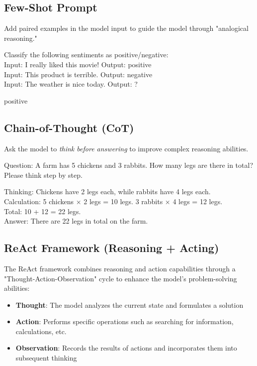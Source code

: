 \documentclass[12pt]{article}
\begin{document}
\subsection{Few-Shot Prompt}
Add paired examples in the model input to guide the model through "analogical reasoning."
\begin{promptbox}
Classify the following sentiments as positive/negative:\\
Input: I really liked this movie! Output: positive\\
Input: This product is terrible. Output: negative\\
Input: The weather is nice today. Output: ?
\end{promptbox}
\begin{outputbox}
positive
\end{outputbox}

\subsection{Chain-of-Thought (CoT)}
Ask the model to \emph{think before answering} to improve complex reasoning abilities.
\begin{promptbox}
Question: A farm has 5 chickens and 3 rabbits. How many legs are there in total? Please think step by step.
\end{promptbox}
\begin{outputbox}
Thinking: Chickens have 2 legs each, while rabbits have 4 legs each.\\
Calculation: 5 chickens × 2 legs = 10 legs. 3 rabbits × 4 legs = 12 legs.\\
Total: 10 + 12 = 22 legs.\\
Answer: There are 22 legs in total on the farm.
\end{outputbox}

\subsection{ReAct Framework (Reasoning + Acting)}
The ReAct framework combines reasoning and action capabilities through a "Thought-Action-Observation" cycle to enhance the model's problem-solving abilities:
\begin{itemize}
  \item \textbf{Thought}: The model analyzes the current state and formulates a solution
  \item \textbf{Action}: Performs specific operations such as searching for information, calculations, etc.
  \item \textbf{Observation}: Records the results of actions and incorporates them into subsequent thinking
\end{itemize}
\end{document}

